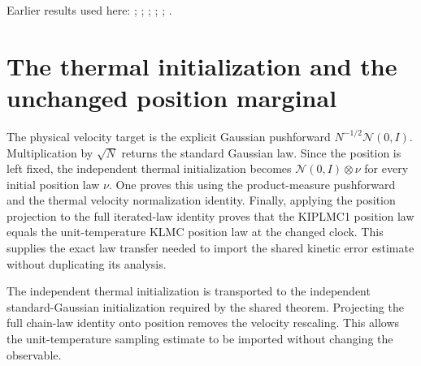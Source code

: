 \documentclass[11pt,a4paper]{article}
\begin{document}
Earlier results used here: \cite[Section~3.33.11]{LangevinLean2026ULASC}; \cite[Section~3.33.6]{LangevinLean2026ULASC}; \cite[Section~3.1.1]{LangevinLean2026IPLA}; \cite[Section~3.1.4]{LangevinLean2026IPLA}; \cite[Section~3.113.3]{LangevinLean2026Kinetic}; \cite[Section~3.12.2]{LangevinLean2026Kinetic}.

\section{\texorpdfstring{The thermal initialization and the unchanged position marginal}{The thermal initialization and the unchanged position marginal}}


The physical velocity target is the explicit Gaussian pushforward \(N^{-1/2}\mathcal N(0,I)\). Multiplication by \(\sqrt N\) returns the standard Gaussian law. Since the position is left fixed, the independent thermal initialization becomes \(\mathcal N(0,I)\otimes\nu\) for every initial position law \(\nu\). One proves this using the product-measure pushforward and the thermal velocity normalization identity. Finally, applying the position projection to the full iterated-law identity proves that the KIPLMC1 position law equals the unit-temperature KLMC position law at the changed clock. This supplies the exact law transfer needed to import the shared kinetic error estimate without duplicating its analysis.



The independent thermal initialization is transported to the independent standard-Gaussian initialization required by the shared theorem. Projecting the full chain-law identity onto position removes the velocity rescaling. This allows the unit-temperature sampling estimate to be imported without changing the observable.
\end{document}

